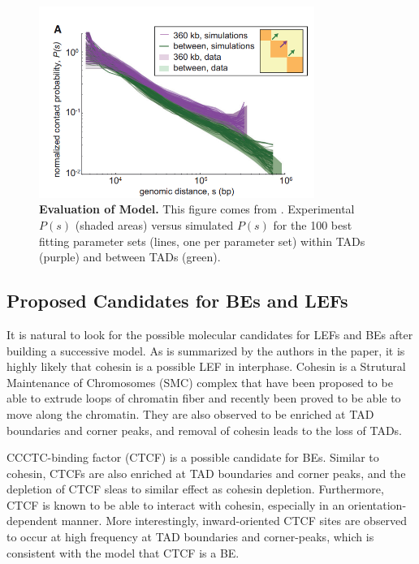 \documentclass[11pt]{article}
\begin{document}
\begin{figure}[htbp]
  \centering
  \includegraphics[width=0.8\textwidth]{assets/Snipaste_2023-01-13_17-49-12.png}
  \caption{\textbf{Evaluation of Model.} This figure comes from \cite{fudenberg_formation_2016}.  Experimental $P(s)$ (shaded areas) versus simulated $P(s)$ for the 100 best fitting parameter sets (lines, one per parameter set) within TADs (purple) and between
  TADs (green).}
  \label{fig: evaluation of model}
\end{figure}

\subsection{Proposed Candidates for BEs and LEFs}

It is natural to look for the possible molecular candidates for LEFs and BEs after building a successive model. As is summarized by the authors in the paper, it is highly likely that cohesin is a possible LEF in interphase. Cohesin is a Strutural Maintenance of Chromosomes (SMC) complex that have been proposed to be able to extrude loops of chromatin fiber and recently been proved to be able to move along the chromatin. They are also observed to be enriched at TAD boundaries and corner peaks, and removal of cohesin leads to the loss of TADs.

CCCTC-binding factor (CTCF) is a possible candidate for BEs. Similar to cohesin, CTCFs are also enriched at TAD boundaries and corner peaks, and the depletion of CTCF sleas to similar effect as cohesin depletion. Furthermore, CTCF is known to be able to interact with cohesin, especially in an orientation-dependent manner. More interestingly, inward-oriented CTCF sites are observed to occur at high frequency at TAD boundaries and corner-peaks, which is consistent with the model that CTCF is a BE.
\end{document}
